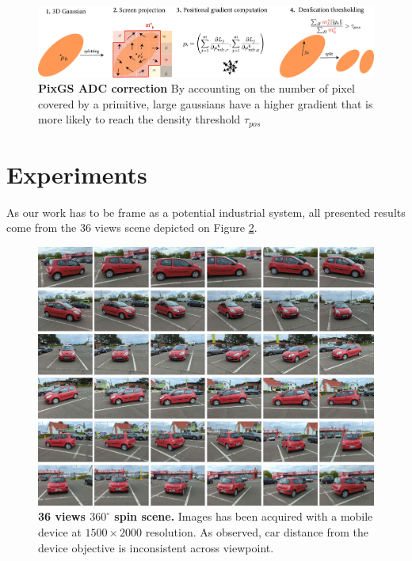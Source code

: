 \begin{figure}[htbp!]
    \center
  \includegraphics[width=\linewidth]{images/gaussiansplatting/pixgs_implem_improvement.png}
  \caption{\textbf{PixGS ADC correction} By accounting on the number of pixel covered by a primitive, large gaussians have a higher gradient that is more likely to reach the density threshold $\tau_{pos}$}
  \label{fig:pixgs-adc}
\end{figure}



\section{Experiments}
\label{sec:exp}

As our work has to be frame as a potential industrial system, all presented results come from the 36 views scene depicted on Figure \ref{fig:all_views}. 
\begin{figure}[htpb!]
  \center
\includegraphics[width=.9\linewidth]{images/gaussiansplatting/original_scene.png}
\caption{\textbf{36 views $360^{\circ}$ spin scene.} Images has been acquired with a mobile device at $1500\times 2000$ resolution. As observed, car distance from the device objective is inconsistent across viewpoint.}
\label{fig:all_views}
\end{figure}

